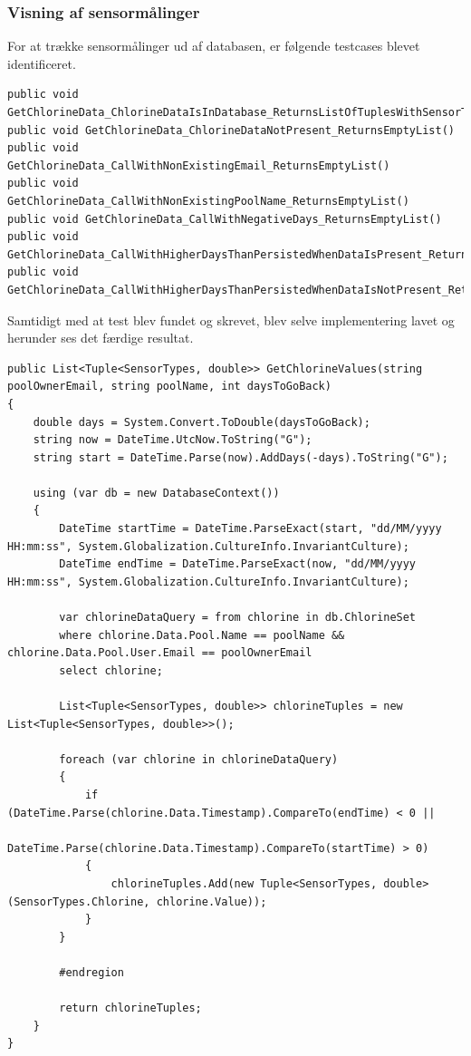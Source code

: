 \subsubsection{Visning af sensormålinger}

For at trække sensormålinger ud af databasen, er følgende testcases blevet identificeret.

\begin{lstlisting}[caption=Testcases til GetChlorineData metoden]
public void GetChlorineData_ChlorineDataIsInDatabase_ReturnsListOfTuplesWithSensorTypeAndValues()
public void GetChlorineData_ChlorineDataNotPresent_ReturnsEmptyList()
public void GetChlorineData_CallWithNonExistingEmail_ReturnsEmptyList()
public void GetChlorineData_CallWithNonExistingPoolName_ReturnsEmptyList()
public void GetChlorineData_CallWithNegativeDays_ReturnsEmptyList()
public void GetChlorineData_CallWithHigherDaysThanPersistedWhenDataIsPresent_ReturnsListWithOnlyDataPresent()
public void GetChlorineData_CallWithHigherDaysThanPersistedWhenDataIsNotPresent_ReturnsEmptyList()
\end{lstlisting}


Samtidigt med at test blev fundet og skrevet, blev selve implementering lavet og herunder ses det færdige resultat.

\begin{lstlisting}[caption=Metoden GetChlorineValues]
public List<Tuple<SensorTypes, double>> GetChlorineValues(string poolOwnerEmail, string poolName, int daysToGoBack)
{
	double days = System.Convert.ToDouble(daysToGoBack);
	string now = DateTime.UtcNow.ToString("G");
	string start = DateTime.Parse(now).AddDays(-days).ToString("G");
	
	using (var db = new DatabaseContext())
	{
		DateTime startTime = DateTime.ParseExact(start, "dd/MM/yyyy HH:mm:ss", System.Globalization.CultureInfo.InvariantCulture);
		DateTime endTime = DateTime.ParseExact(now, "dd/MM/yyyy HH:mm:ss", System.Globalization.CultureInfo.InvariantCulture);
	
		var chlorineDataQuery = from chlorine in db.ChlorineSet
		where chlorine.Data.Pool.Name == poolName && chlorine.Data.Pool.User.Email == poolOwnerEmail
		select chlorine;
		
		List<Tuple<SensorTypes, double>> chlorineTuples = new List<Tuple<SensorTypes, double>>();
		
		foreach (var chlorine in chlorineDataQuery)
		{
			if (DateTime.Parse(chlorine.Data.Timestamp).CompareTo(endTime) < 0 ||
			DateTime.Parse(chlorine.Data.Timestamp).CompareTo(startTime) > 0)
			{
				chlorineTuples.Add(new Tuple<SensorTypes, double>(SensorTypes.Chlorine, chlorine.Value));
			}
		}
		
		#endregion
		
		return chlorineTuples;
	}
}
\end{lstlisting}





